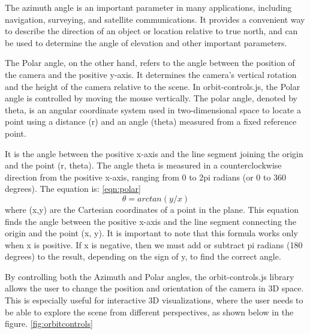 The azimuth angle is an important parameter in many applications, including navigation, surveying, and satellite communications. 
It provides a convenient way to describe the direction of an object or location relative to true north, 
and can be used to determine the angle of elevation and other important parameters.

The Polar angle, on the other hand, refers to the angle between the position of the camera and the 
positive y-axis. It determines the camera's vertical rotation and the height of the camera relative 
to the scene. In orbit-controls.js, the Polar angle is controlled by moving the mouse vertically.
The polar angle, denoted by theta, is an angular coordinate system used in two-dimensional space to locate 
a point using a distance (r) and an angle (theta) measured from a fixed reference point.

It is the angle between the positive x-axis and the line segment 
joining the origin and the point (r, theta). The angle theta is measured in a counterclockwise direction 
from the positive x-axis, ranging from 0 to 2pi radians (or 0 to 360 degrees). The equation is: \ref{eqn:polar}
\begin{equation}
  \label{eqn:polar}
  \theta = arctan(y/x)
\end{equation}
where (x,y) are the Cartesian coordinates of a point in the plane. This equation finds the angle between the positive x-axis 
and the line segment connecting the origin and the point (x, y).
It is important to note that this formula works only when x is positive. If x is negative, 
then we must add or subtract pi radians (180 degrees) to the result, depending on the sign of y, to find the correct angle.

By controlling both the Azimuth and Polar angles, the orbit-controls.js library allows the user to 
change the position and orientation of the camera in 3D space. This is especially useful for interactive 
3D visualizations, where the user needs to be able to explore the scene from different perspectives, as shown below in the figure. \ref{fig:orbitcontrols}

